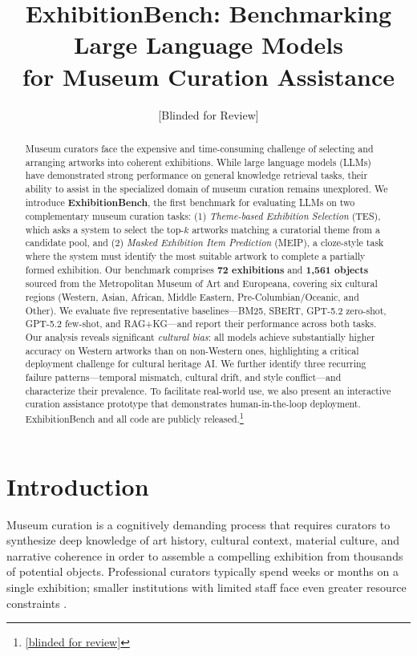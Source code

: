 \documentclass[11pt]{article}
\title{ExhibitionBench: Benchmarking Large Language Models\\
       for Museum Curation Assistance}
\author{[Blinded for Review]}
\begin{document}
\maketitle

\begin{abstract}
Museum curators face the expensive and time-consuming challenge of selecting and
arranging artworks into coherent exhibitions.
While large language models (LLMs) have demonstrated strong performance on
general knowledge retrieval tasks, their ability to assist in the specialized
domain of museum curation remains unexplored.
We introduce \textbf{ExhibitionBench}, the first benchmark for evaluating LLMs
on two complementary museum curation tasks:
(1) \textit{Theme-based Exhibition Selection} (TES), which asks a system to select
the top-$k$ artworks matching a curatorial theme from a candidate pool, and
(2) \textit{Masked Exhibition Item Prediction} (MEIP), a cloze-style task where
the system must identify the most suitable artwork to complete a partially formed
exhibition.
Our benchmark comprises \textbf{72 exhibitions} and \textbf{1,561 objects}
sourced from the Metropolitan Museum of Art and Europeana, covering six cultural
regions (Western, Asian, African, Middle Eastern, Pre-Columbian/Oceanic, and
Other).
We evaluate five representative baselines---BM25, SBERT, GPT-5.2 zero-shot,
GPT-5.2 few-shot, and RAG+KG---and report their performance across both tasks.
Our analysis reveals significant \emph{cultural bias}: all models achieve
substantially higher accuracy on Western artworks than on non-Western ones,
highlighting a critical deployment challenge for cultural heritage AI.
We further identify three recurring failure patterns---temporal mismatch,
cultural drift, and style conflict---and characterize their prevalence.
To facilitate real-world use, we also present an interactive curation assistance
prototype that demonstrates human-in-the-loop deployment.
ExhibitionBench and all code are publicly released.\footnote{%
  \url{[blinded for review]}}
\end{abstract}

\section{Introduction}
\label{sec:intro}

Museum curation is a cognitively demanding process that requires curators to
synthesize deep knowledge of art history, cultural context, material culture,
and narrative coherence in order to assemble a compelling exhibition from
thousands of potential objects.
Professional curators typically spend weeks or months on a single exhibition;
smaller institutions with limited staff face even greater resource constraints
\citep{dudley2010museum}.
\end{document}
